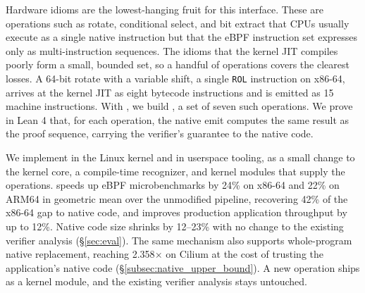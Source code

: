 Hardware idioms are the lowest-hanging fruit for this interface.
These are operations such as rotate, conditional select, and bit extract that CPUs usually execute as a single native instruction but that the eBPF instruction set expresses only as multi-instruction sequences.
The idioms that the kernel JIT compiles poorly form a small, bounded set, so a handful of operations covers the clearest losses.
A 64-bit rotate with a variable shift, a single \texttt{ROL} instruction on x86-64, arrives at the kernel JIT as eight bytecode instructions and is emitted as 15 machine instructions.
With \tool, we build \lang, a set of seven such operations.
We prove in Lean 4 that, for each operation, the native emit computes the same result as the proof sequence, carrying the verifier's guarantee to the native code.

We implement \tool in the Linux kernel and in userspace tooling, as a small change to the kernel core, a compile-time recognizer, and kernel modules that supply the operations.
\lang speeds up eBPF microbenchmarks by 24\% on x86-64 and 22\% on ARM64 in geometric mean over the unmodified pipeline, recovering 42\% of the x86-64 gap to native code, and improves production application throughput by up to 12\%.
Native code size shrinks by 12--23\% with no change to the existing verifier analysis (\S\ref{sec:eval}).
The same \tool mechanism also supports whole-program native replacement, reaching 2.358$\times$ on Cilium at the cost of trusting the application's native code (\S\ref{subsec:native_upper_bound}).
A new operation ships as a kernel module, and the existing verifier analysis stays untouched.

